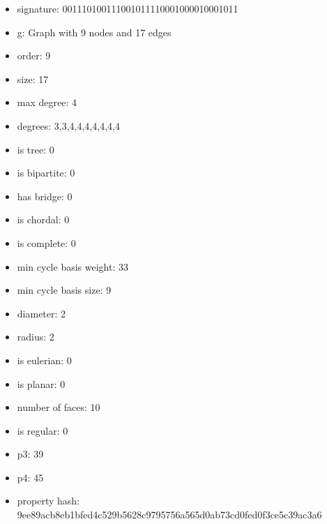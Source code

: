 \newpage
\begin{figure}
\end{figure}
\begin{itemize}
\item signature: 001110100111001011110001000010001011
\item g: Graph with 9 nodes and 17 edges
\item order: 9
\item size: 17
\item max degree: 4
\item degrees: 3,3,4,4,4,4,4,4,4
\item is tree: 0
\item is bipartite: 0
\item has bridge: 0
\item is chordal: 0
\item is complete: 0
\item min cycle basis weight: 33
\item min cycle basis size: 9
\item diameter: 2
\item radius: 2
\item is eulerian: 0
\item is planar: 0
\item number of faces: 10
\item is regular: 0
\item p3: 39
\item p4: 45
\item property hash: 9ee89acb8eb1bfed4c529b5628c9795756a565d0ab73cd0fed0f3ce5c39ac3a6
\end{itemize}
